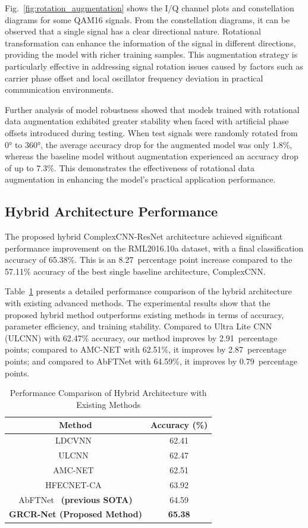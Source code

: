 \documentclass[conference]{IEEEtran}
\begin{document}
Fig.~\ref{fig:rotation_augmentation} shows the I/Q channel plots and constellation diagrams for some QAM16 signals. From the constellation diagrams, it can be observed that a single signal has a clear directional nature. Rotational transformation can enhance the information of the signal in different directions, providing the model with richer training samples. This augmentation strategy is particularly effective in addressing signal rotation issues caused by factors such as carrier phase offset and local oscillator frequency deviation in practical communication environments.

Further analysis of model robustness showed that models trained with rotational data augmentation exhibited greater stability when faced with artificial phase offsets introduced during testing. When test signals were randomly rotated from 0° to 360°, the average accuracy drop for the augmented model was only 1.8\%, whereas the baseline model without augmentation experienced an accuracy drop of up to 7.3\%. This demonstrates the effectiveness of rotational data augmentation in enhancing the model's practical application performance.

\subsection{Hybrid Architecture Performance}

The proposed hybrid ComplexCNN-ResNet architecture achieved significant performance improvement on the RML2016.10a dataset, with a final classification accuracy of 65.38\%. This is an 8.27~percentage point increase compared to the 57.11\% accuracy of the best single baseline architecture, ComplexCNN.

Table~\ref{tab:hybrid_performance} presents a detailed performance comparison of the hybrid architecture with existing advanced methods. The experimental results show that the proposed hybrid method outperforms existing methods in terms of accuracy, parameter efficiency, and training stability. Compared to Ultra Lite CNN (ULCNN) with 62.47\% accuracy, our method improves by 2.91~percentage points; compared to AMC-NET with 62.51\%, it improves by 2.87~percentage points; and compared to AbFTNet with 64.59\%, it improves by 0.79~percentage points.

\begin{table}[!htbp]
\centering
\caption{Performance Comparison of Hybrid Architecture with Existing Methods}
\label{tab:hybrid_performance}
\begin{tabular}{@{}cc@{}}
\toprule
Method & Accuracy (\%) \\
\midrule
LDCVNN~\cite{xu2025ldcvnn} & 62.41 \\
ULCNN~\cite{guo2024ulcnn} & 62.47 \\
AMC-NET~\cite{zhang2023amcnet} & 62.51 \\
HFECNET-CA~\cite{ma2023hfecnetca} & 63.92 \\
AbFTNet~\cite{ning2024abftnet} \textbf{(previous SOTA)} & 64.59 \\
\textbf{GRCR-Net (Proposed Method)} & \textbf{65.38} \\
\bottomrule
\end{tabular}
\end{table}
\end{document}

